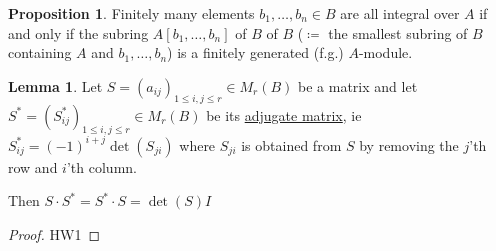 \documentclass[openany]{amsbook}
\numberwithin{section}{chapter}
\theoremstyle{definition}
\newtheorem{proposition}[theorem]{Proposition}
\newtheorem{lemma}[theorem]{Lemma}
\begin{document}
\begin{proposition}
    Finitely many elements \(b_1, \dots , b_n \in B\) are all integral over \(A\) if and only if the subring \(A[b_1, \dots , b_n]\) of \(B\) of \(B\) (\(\coloneqq\) the smallest subring of \(B\) containing \(A\) and \(b_1, \dots , b_n\)) is a finitely generated (f.g.) \(A\)-module.
\end{proposition}

\begin{lemma} Let \(S = (a_{ij})_{1 \leq i, j \leq r} \in M_r(B)\) be a matrix and let \(S^{\ast} = (S^{\ast}_{ij})_{1 \leq i, j \leq r} \in M_r(B)\) be its \underline{adjugate matrix}, ie \(S_{ij}^{\ast} = (-1)^{i + j}\det(S_{ji})\) where \(S_{ji}\) is obtained from \(S\) by removing the \(j\)'th row and \(i\)'th column.

Then \(S \cdot S^{\ast} = S^{\ast} \cdot S = \det(S)I\) 
\end{lemma}

\begin{proof}
    HW1
\end{proof}
\end{document}
